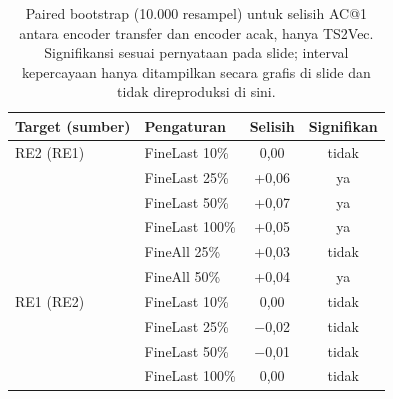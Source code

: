 \begin{table}
\caption{Paired bootstrap (10.000 resampel) untuk selisih AC@1 antara encoder transfer dan encoder acak, hanya TS2Vec. Signifikansi sesuai pernyataan pada slide; interval kepercayaan hanya ditampilkan secara grafis di slide dan tidak direproduksi di sini.}\label{tab:bootstrap}
\centering
\small
\begin{tabular}{llcc}
\toprule
Target (sumber) & Pengaturan & Selisih & Signifikan\\
\midrule
RE2 (RE1) & FineLast 10\%  & 0,00 & tidak\\
          & FineLast 25\%  & +0,06 & ya\\
          & FineLast 50\%  & +0,07 & ya\\
          & FineLast 100\% & +0,05 & ya\\
          & FineAll 25\%   & +0,03 & tidak\\
          & FineAll 50\%   & +0,04 & ya\\
\midrule
RE1 (RE2) & FineLast 10\%  & 0,00 & tidak\\
          & FineLast 25\%  & $-$0,02 & tidak\\
          & FineLast 50\%  & $-$0,01 & tidak\\
          & FineLast 100\% & 0,00 & tidak\\
\bottomrule
\end{tabular}
\end{table}
